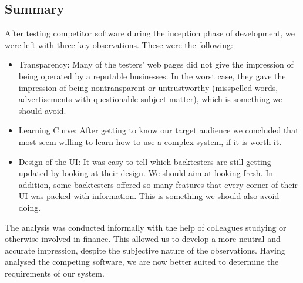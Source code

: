 \documentclass[main.tex]{subfiles}
\begin{document}
\subsection{Summary}
\label{reliability}

After testing competitor software during the inception phase of development, we were left with three key observations. These were the following:

\begin{itemize}
    \item Transparency: Many of the testers' web pages did not give the impression of being operated by a reputable businesses. In the worst case, they gave the impression of being nontransparent or untrustworthy (misspelled words, advertisements with questionable subject matter), which is something we should avoid.
    \item Learning Curve: After getting to know our target audience we concluded that most seem willing to learn how to use a complex system, if it is worth it.
    \item Design of the UI: It was easy to tell which backtesters are still getting updated by looking at their design. We should aim at looking fresh. In addition, some backtesters offered so many features that every corner of their UI was packed with information. This is something we should also avoid doing.
\end{itemize}

The analysis was conducted informally with the help of colleagues studying or otherwise involved in finance. This allowed us to develop a more neutral and accurate impression, despite the subjective nature of the observations. Having analysed the competing software, we are now better suited to determine the requirements of our system. 
\end{document}
